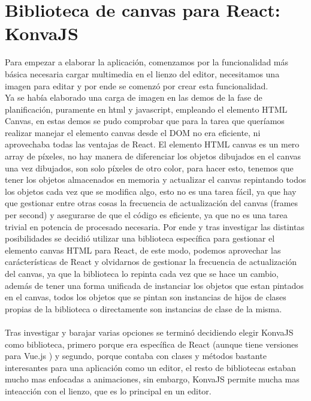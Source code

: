 \section{Biblioteca de canvas para React: KonvaJS}
Para empezar a elaborar la aplicación, comenzamos por la funcionalidad más básica necesaria
cargar multimedia en el lienzo del editor, necesitamos una imagen para editar y por
ende se comenzó por crear esta funcionalidad.
\\
Ya se había elaborado una carga de imagen en las demos de la fase de planificación, 
puramente en html y javascript, empleando el elemento HTML Canvas, en estas demos 
se pudo comprobar que para la tarea que queríamos realizar manejar el elemento
canvas desde el DOM\cite{DOM} no era eficiente, ni aprovechaba todas las ventajas 
de React.
El elemento HTML canvas es un mero array de píxeles, no hay manera de diferenciar 
los objetos dibujados en el canvas una vez dibujados, son solo píxeles de otro color,
para hacer esto, tenemos que tener los objetos almacenados en memoria y actualizar el
canvas repintando todos los objetos cada vez que se modifica algo, esto no es una 
tarea fácil, ya que hay que gestionar entre otras cosas la frecuencia de actualización
del canvas (frames per second) y asegurarse de que el código es eficiente, ya que 
no es una tarea trivial en potencia de procesado necesaria.
Por ende y tras investigar las distintas posibilidades se decidió utilizar una 
biblioteca específica para gestionar el elemento canvas HTML para React, de este
modo, podemos aprovechar las carácterísticas de React y olvidarnos de gestionar 
la frecuencia de actualización del canvas, ya que la biblioteca lo repinta cada vez
que se hace un cambio, además de tener una forma unificada de instanciar los objetos
que estan pintados en el canvas, todos los objetos que se pintan son instancias de 
hijos de clases propias de la biblioteca o directamente son instancias de clase de la 
misma.
\\\\
Tras investigar y barajar varias opciones se terminó decidiendo elegir KonvaJS 
\cite{KonvaJS} como biblioteca, primero porque era específica de React
(aunque tiene versiones para Vue.js ) 
y segundo, porque contaba con clases y métodos bastante interesantes para una aplicación
como un editor, el resto de bibliotecas estaban mucho mas enfocadas a animaciones, sin 
embargo, KonvaJS permite mucha mas inteacción con el lienzo, que es lo principal en un
editor.
